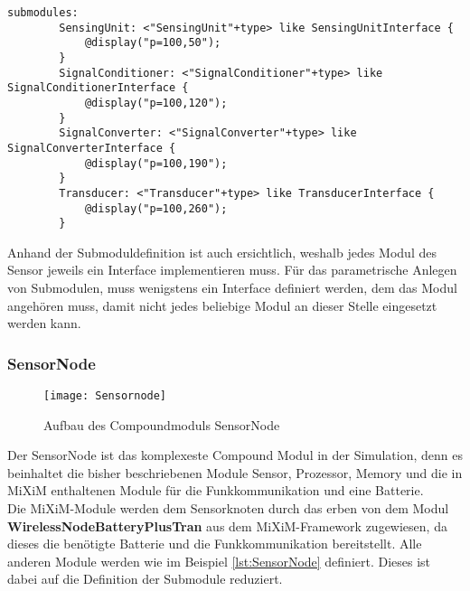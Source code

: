 \begin{lstlisting}[language=ned,caption={AbstractSensor},label=lst:AbstractSensor]
submodules:
        SensingUnit: <"SensingUnit"+type> like SensingUnitInterface {
            @display("p=100,50");
        }
        SignalConditioner: <"SignalConditioner"+type> like SignalConditionerInterface {
            @display("p=100,120");
        }
        SignalConverter: <"SignalConverter"+type> like SignalConverterInterface {
            @display("p=100,190");
        }
        Transducer: <"Transducer"+type> like TransducerInterface {
            @display("p=100,260");
        }
\end{lstlisting}

Anhand der Submoduldefinition ist auch ersichtlich, weshalb jedes Modul des Sensor jeweils ein Interface implementieren muss. Für das parametrische Anlegen von Submodulen, muss wenigstens ein Interface definiert werden, dem das Modul angehören muss, damit nicht jedes beliebige Modul an dieser Stelle eingesetzt werden kann.

\subsubsection{SensorNode}

\begin{figure}[htbp]
\centering
\caption{Aufbau des Compoundmoduls SensorNode}
\label{fig:Sensornode}
\texttt{[image: Sensornode]}
\end{figure}

Der SensorNode ist das komplexeste Compound Modul in der Simulation, denn es beinhaltet die bisher beschriebenen Module Sensor, Prozessor, Memory und die in MiXiM enthaltenen Module für die Funkkommunikation und eine Batterie.\\
Die MiXiM-Module werden dem Sensorknoten durch das erben von dem Modul \textbf{WirelessNodeBatteryPlusTran} aus dem MiXiM-Framework zugewiesen, da dieses die benötigte Batterie und die Funkkommunikation bereitstellt. Alle anderen Module werden wie im Beispiel \ref{lst:SensorNode} definiert. Dieses ist dabei auf die Definition der Submodule reduziert.

